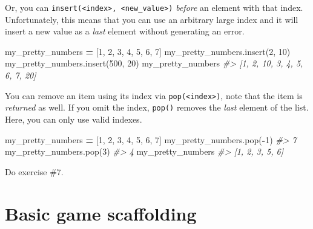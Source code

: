 \documentclass[
]{book}
\newenvironment{Shaded}{\begin{snugshade}}{\end{snugshade}}
\newcommand{\CommentTok}[1]{\textcolor[rgb]{0.56,0.35,0.01}{\textit{#1}}}
\newcommand{\DecValTok}[1]{\textcolor[rgb]{0.00,0.00,0.81}{#1}}
\newcommand{\NormalTok}[1]{#1}
\newcommand{\OperatorTok}[1]{\textcolor[rgb]{0.81,0.36,0.00}{\textbf{#1}}}
\begin{document}
Or, you can \texttt{insert(\textless{}index\textgreater{},\ \textless{}new\_value\textgreater{})} \emph{before} an element with that index. Unfortunately, this means that you can use an arbitrary large index and it will insert a new value as a \emph{last} element without generating an error.

\begin{Shaded}
\begin{Highlighting}[]
\NormalTok{my\_pretty\_numbers }\OperatorTok{=}\NormalTok{ [}\DecValTok{1}\NormalTok{, }\DecValTok{2}\NormalTok{, }\DecValTok{3}\NormalTok{, }\DecValTok{4}\NormalTok{, }\DecValTok{5}\NormalTok{, }\DecValTok{6}\NormalTok{, }\DecValTok{7}\NormalTok{]}
\NormalTok{my\_pretty\_numbers.insert(}\DecValTok{2}\NormalTok{, }\DecValTok{10}\NormalTok{)}
\NormalTok{my\_pretty\_numbers.insert(}\DecValTok{500}\NormalTok{, }\DecValTok{20}\NormalTok{)}
\NormalTok{my\_pretty\_numbers}
\CommentTok{\#\textgreater{} [1, 2, 10, 3, 4, 5, 6, 7, 20]}
\end{Highlighting}
\end{Shaded}

You can remove an item using its index via \texttt{pop(\textless{}index\textgreater{})}, note that the item is \emph{returned} as well. If you omit the index, \texttt{pop()} removes the \emph{last} element of the list. Here, you can only use valid indexes.

\begin{Shaded}
\begin{Highlighting}[]
\NormalTok{my\_pretty\_numbers }\OperatorTok{=}\NormalTok{ [}\DecValTok{1}\NormalTok{, }\DecValTok{2}\NormalTok{, }\DecValTok{3}\NormalTok{, }\DecValTok{4}\NormalTok{, }\DecValTok{5}\NormalTok{, }\DecValTok{6}\NormalTok{, }\DecValTok{7}\NormalTok{]}
\NormalTok{my\_pretty\_numbers.pop(}\OperatorTok{{-}}\DecValTok{1}\NormalTok{)}
\CommentTok{\#\textgreater{} 7}
\NormalTok{my\_pretty\_numbers.pop(}\DecValTok{3}\NormalTok{)}
\CommentTok{\#\textgreater{} 4}
\NormalTok{my\_pretty\_numbers}
\CommentTok{\#\textgreater{} [1, 2, 3, 5, 6]}
\end{Highlighting}
\end{Shaded}

Do exercise \#7.

\hypertarget{basic-game-scaffolding}{%
\section{Basic game scaffolding}\label{basic-game-scaffolding}}
\end{document}
